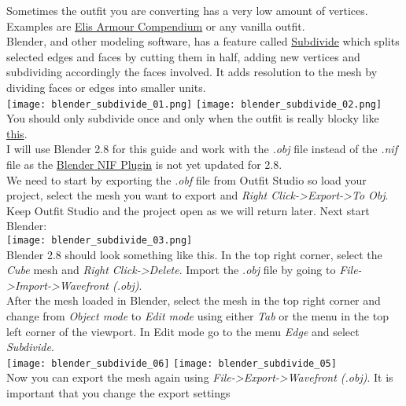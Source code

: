 Sometimes the outfit you are converting has a very low amount of vertices. Examples are 
\href{https://www.nexusmods.com/fallout4/mods/22431}{Elis Armour Compendium} or any vanilla outfit.\\
Blender, and other modeling software, has a feature called \href{https://docs.blender.org/manual/en/latest/modeling/meshes/editing/subdividing/subdivide.html}{Subdivide}
which splits selected edges and faces by cutting them in half, adding new vertices and 
subdividing accordingly the faces involved. It adds resolution to the mesh by dividing faces or edges into 
smaller units.\\
\texttt{[image: blender\_subdivide\_01.png]}
\texttt{[image: blender\_subdivide\_02.png]}\\
You should only subdivide once and only when the outfit is really blocky like \href{https://speed-new.com/wp-content/uploads/2015/10/34254.jpg}{this}.\\
I will use Blender 2.8 for this guide and work with the \textit{.obj} file instead of the \textit{.nif} file as 
the \href{https://github.com/niftools/blender_nif_plugin}{Blender NIF Plugin} is not yet updated for 2.8.\\
We need to start by exporting the \textit{.obf} file from Outfit Studio so load your project, select the mesh 
you want to export and \textit{Right Click->Export->To Obj}. Keep Outfit Studio and the project open as we will return 
later. Next start Blender:\\
\texttt{[image: blender\_subdivide\_03.png]}\\
\linebreak
\linebreak
Blender 2.8 should look something like this. In the top right corner, select the \textit{Cube} mesh and \textit{Right Click->Delete}.
Import the \textit{.obj} file by going to \textit{File->Import->Wavefront (.obj)}.\\
After the mesh loaded in Blender, select the mesh in the top right corner and change from \textit{Object mode} to \textit{Edit mode}
using either \textit{Tab} or the menu in the top left corner of the viewport. In Edit mode go to the menu \textit{Edge} and select 
\textit{Subdivide}.\\
\texttt{[image: blender\_subdivide\_06]}
\texttt{[image: blender\_subdivide\_05]}\\
Now you can export the mesh again using \textit{File->Export->Wavefront (.obj)}. It is important that you change the export settings

